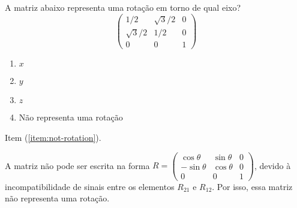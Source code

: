 \begin{question}
    A matriz abaixo representa uma rotação em torno de qual eixo?
    \begin{equation*}
      \begin{pmatrix}
               1/2 & \sqrt{3}/2 & 0 \\
        \sqrt{3}/2 &        1/2 & 0 \\
                 0 &          0 & 1
      \end{pmatrix}
    \end{equation*}

    \begin{enumerate}
      \item $x$
      \item $y$
      \item $z$
      \item\label{item:not-rotation} Não representa uma rotação
    \end{enumerate}

    \begin{answer}
      Item (\ref{item:not-rotation}).
    \end{answer}

    \begin{solution}
      A matriz não pode ser escrita na forma
      $R = \begin{pmatrix}
        \cos\theta  & \sin\theta & 0\\
        -\sin\theta & \cos\theta & 0\\
        0           & 0          & 1
      \end{pmatrix}$, devido à incompatibilidade de sinais entre os elementos $R_{21}$ e $R_{12}$.
      Por isso, essa matriz não representa uma rotação.
    \end{solution}
\end{question}